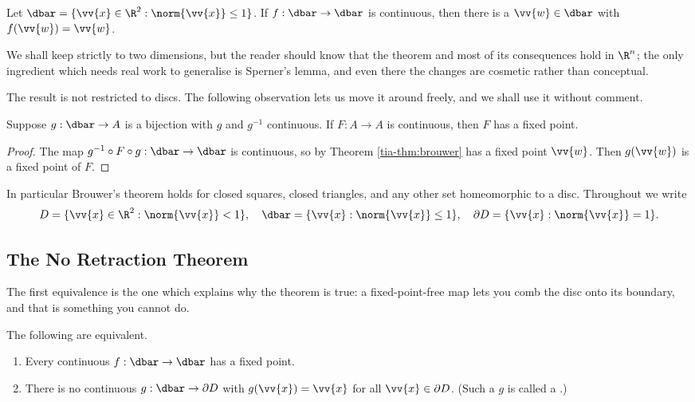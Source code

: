 \begin{theorem}\label{tia-thm:brouwer}
	Let $\dbar = \{\vv{x} \in \R^2 : \norm{\vv{x}} \leq 1\}$. If $f : \dbar \to \dbar$ is continuous, then there is a $\vv{w} \in \dbar$ with $f(\vv{w}) = \vv{w}$.
\end{theorem}

We shall keep strictly to two dimensions, but the reader should know that the theorem and most of its consequences hold in $\R^n$; the only ingredient which needs real work to generalise is Sperner's lemma, and even there the changes are cosmetic rather than conceptual.

The result is not restricted to discs. The following observation lets us move it around freely, and we shall use it without comment.

\begin{lemma}\label{lem:homeo-transfer}
	Suppose $g : \dbar \to A$ is a bijection with $g$ and $g^{-1}$ continuous. If $F : A \to A$ is continuous, then $F$ has a fixed point.
\end{lemma}

\begin{proof}
	The map $g^{-1} \circ F \circ g : \dbar \to \dbar$ is continuous, so by Theorem \ref{tia-thm:brouwer} has a fixed point $\vv{w}$. Then $g(\vv{w})$ is a fixed point of $F$.
\end{proof}

In particular Brouwer's theorem holds for closed squares, closed triangles, and any other set homeomorphic to a disc. Throughout we write
$$D = \{\vv{x} \in \R^2 : \norm{\vv{x}}<1\}, \quad \dbar = \{\vv{x}: \norm{\vv{x}}\leq 1\}, \quad \partial D = \{\vv{x} : \norm{\vv{x}}=1\}.$$

\subsection{The No Retraction Theorem}

The first equivalence is the one which explains why the theorem is true: a fixed-point-free map lets you comb the disc onto its boundary, and that is something you cannot do.

\begin{theorem}\label{thm:no-retract}
	The following are equivalent.
	\begin{enumerate}[label=(\roman*)]
		\item Every continuous $f : \dbar \to \dbar$ has a fixed point.
		\item There is no continuous $g : \dbar \to \partial D$ with $g(\vv{x}) = \vv{x}$ for all $\vv{x} \in \partial D$. (Such a $g$ is called a .)
	\end{enumerate}
\end{theorem}

